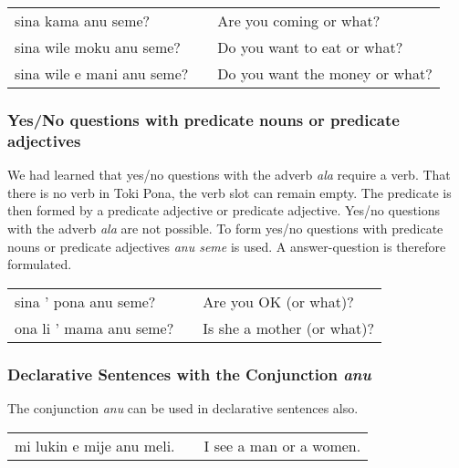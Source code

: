 \begin{supertabular}{p{5,5cm}|ll}
    sina kama anu seme?        &  & Are you coming or what?        \\
    sina wile moku anu seme?   &  & Do you want to eat or what?    \\
    sina wile e mani anu seme? &  & Do you want the money or what? \\
\end{supertabular}

%
\subsubsection*{Yes/No questions with predicate nouns or predicate adjectives}
%
%
We had learned that yes/no questions with the adverb \textit{ala} require a verb.
That there is no verb in Toki Pona, the verb slot can remain empty.
The predicate is then formed by a predicate adjective or predicate adjective.
Yes/no questions with the adverb \textit{ala} are not possible.
To form yes/no questions with predicate nouns or predicate adjectives \textit{anu seme} is used.
A answer-question is therefore formulated.

\begin{supertabular}{p{5,5cm}|ll}
    sina ' pona anu seme?   &  & Are you OK (or what)?      \\
    ona li ' mama anu seme? &  & Is she a mother (or what)? \\
\end{supertabular}

%
\subsubsection*{Declarative Sentences with the Conjunction \textit{anu}}
%

The conjunction \textit{anu} can be used in declarative sentences also.

\begin{supertabular}{p{5,5cm}|ll}
    mi lukin e mije anu meli. &  & I see a man or a women. \\
\end{supertabular}

